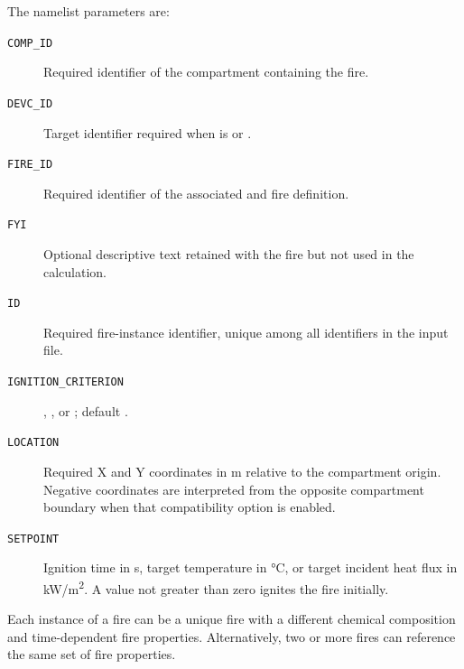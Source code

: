 {{The  namelist parameters are:
\begin{description}
\item[\texttt{COMP\_ID}] Required identifier of the compartment containing the fire.
\item[\texttt{DEVC\_ID}] Target identifier required when  is  or .
\item[\texttt{FIRE\_ID}] Required identifier of the associated  and  fire definition.
\item[\texttt{FYI}] Optional descriptive text retained with the fire but not used in the calculation.
\item[\texttt{ID}] Required fire-instance identifier, unique among all identifiers in the input file.
\item[\texttt{IGNITION\_CRITERION}] , , or ; default .
\item[\texttt{LOCATION}] Required X and Y coordinates in \unit{m} relative to the compartment origin. Negative coordinates are interpreted from the opposite compartment boundary when that compatibility option is enabled.
\item[\texttt{SETPOINT}] Ignition time in s, target temperature in \unit{\degreeCelsius}, or target incident heat flux in \unit{kW/m^2}. A value not greater than zero ignites the fire initially.
\end{description}

Each instance of a fire can be a unique fire with a different chemical composition and time-dependent fire properties. Alternatively, two or more fires can reference the same set of fire properties.

}}
